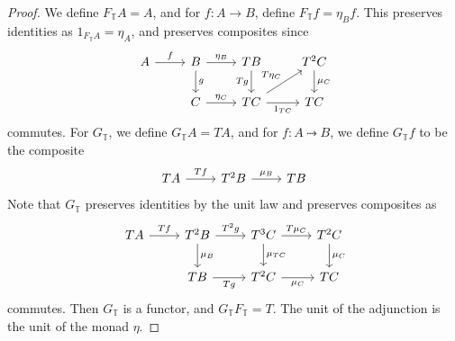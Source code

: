 \begin{proof}
    We define \( F_{\mathbb T} A = A \), and for \( f : A \to B \), define \( F_{\mathbb T} f = \eta_B f \).
    This preserves identities as \( 1_{F_{\mathbb T} A} = \eta_A \), and preserves composites since%
    \[\begin{tikzcd}
        A & B & TB & {T^2C} \\
        & C & TC & TC
        \arrow["f", from=1-1, to=1-2]
        \arrow["{\eta_B}", from=1-2, to=1-3]
        \arrow["Tg"', from=1-3, to=2-3]
        \arrow["{T\eta_C}", from=2-3, to=1-4]
        \arrow["{\mu_C}", from=1-4, to=2-4]
        \arrow["{1_{TC}}"', from=2-3, to=2-4]
        \arrow["g", from=1-2, to=2-2]
        \arrow["{\eta_C}", from=2-2, to=2-3]
    \end{tikzcd}\]
    commutes.
    For \( G_{\mathbb T} \), we define \( G_{\mathbb T} A = TA \), and for \( f : A \rightdotarrow B \), we define \( G_{\mathbb T} f \) to be the composite
\[\begin{tikzcd}
	TA & T^2B & TB
	\arrow["Tf", from=1-1, to=1-2]
	\arrow["{\mu_B}", from=1-2, to=1-3]
\end{tikzcd}\]
    Note that \( G_{\mathbb T} \) preserves identities by the unit law and preserves composites as
\[\begin{tikzcd}
	TA & {T^2B} & {T^3C} & {T^2C} \\
	& TB & {T^2C} & TC
	\arrow["Tf", from=1-1, to=1-2]
	\arrow["{T^2g}", from=1-2, to=1-3]
	\arrow["{T\mu_C}", from=1-3, to=1-4]
	\arrow["{\mu_C}", from=1-4, to=2-4]
	\arrow["{\mu_{TC}}", from=1-3, to=2-3]
	\arrow["{\mu_C}"', from=2-3, to=2-4]
	\arrow["{\mu_B}", from=1-2, to=2-2]
	\arrow["Tg"', from=2-2, to=2-3]
\end{tikzcd}\]
    commutes.
    Then \( G_{\mathbb T} \) is a functor, and \( G_{\mathbb T} F_{\mathbb T} = T \).
    The unit of the adjunction is the unit of the monad \( \eta \).

\end{proof}
